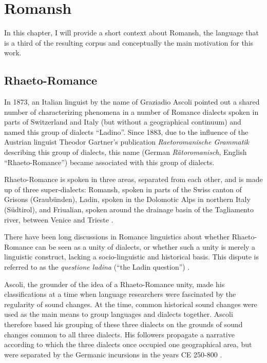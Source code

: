 \chapter{Romansh}\label{chap:romansh}

In this chapter, I will provide a short context about Romansh, the language that is a third of the resulting corpus and conceptually the main motivation for this work.

\section{Rhaeto-Romance}\label{sec:rhaeto-romance}
In 1873, an Italian linguist by the name of Graziadio Ascoli pointed out a shared number of characterizing phenomena in a number of Romance dialects spoken in parts of Switzerland and Italy (but without a geographical continuum) and named this group of dialects \enquote{Ladino}. Since 1883, due to the influence of the Austrian linguist Theodor Gartner's publication \emph{Raetoromanische Grammatik}  describing this group of dialects, this name (German \emph{Rätoromanisch}, English \enquote{Rhaeto-Romance}) became associated with this group of dialects. 

Rhaeto-Romance is spoken in three areas, separated from each other, and is made up of three super-dialects: Romansh, spoken in parts of the Swiss canton of Grisons (Graubünden), Ladin, spoken in the Dolomotic Alps in northern Italy (Südtirol), and Friualian, spoken around the drainage basin of the Tagliamento river, between Venice and Trieste \autocite[1]{haiman1992}.

There have been long discussions in Romance linguistics about whether Rhaeto-Romance can be seen as a unity of dialects, or whether such a unity is merely a linguistic construct, lacking a socio-linguistic and historical basis. 
This dispute is referred to as the \emph{questione ladina} (\enquote{the Ladin question}) \autocite{liver1999}. 

Ascoli, the grounder of the idea of a Rhaeto-Romance unity, made his classifications at a time when language researchers were fascinated by the regularity of sound changes. At the time,  common historical sound changes were used as the main means to group languages and dialects together. Ascoli therefore based his grouping of these three dialects on the grounds of sound changes common to all three dialects. 
His followers propagate a narrative according to which the three dialects once occupied one geographical area, but were separated by the Germanic incursions in the years CE 250-800 \autocites[174]{bossong2008}[11]{haiman1992}.

